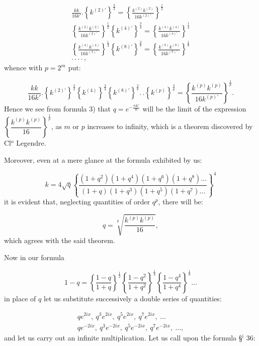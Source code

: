 \documentclass{article}
\begin{document}
\[
\begin{gathered}
\frac{kk}{16k'}.\left\{k^{(2)\prime}\right\}^{\frac{3}{2}}=\left\{\frac{k^{(2)}k^{(2)}}{16k^{(2)\prime}}\right\}^{\frac{1}{2}}\\[1.5ex]
\left\{\frac{k^{(2)}k^{(2)}}{16k^{(2)\prime}}\right\}^{\frac{1}{2}}\left\{k^{(4)\prime}\right\}^{\frac{3}{4}}=\left\{\frac{k^{(4)}k^{(4)}}{16k^{(4)\prime}}\right\}^{\frac{1}{4}}\\[1.5ex]
\left\{\frac{k^{(4)}k^{(4)}}{16k^{(4)\prime}}\right\}^{\frac{1}{4}}\left\{k^{(8)\prime}\right\}^{\frac{3}{8}}=\left\{\frac{k^{(8)}k^{(8)}}{16k^{(8)\prime}}\right\}^{\frac{1}{8}}\\[1.5ex]
.\,.\,.\,.\,,
\end{gathered}
\]
whence with $p=2^{m}$ put:

\[
\frac{kk}{16k'}.\left\{k^{(2)\prime}\right\}^{\frac{3}{2}}\left\{k^{(4)}\right\}^{\frac{3}{4}}\left\{k^{(8)\prime}\right\}^{\frac{3}{8}}.\,.\left\{k^{(p)}\right\}^{\frac{3}{p}}=\left\{\frac{k^{(p)}k^{(p)}}{16k^{(p)\prime}}\right\}^{\frac{1}{p}}.
\]
Hence we see from formula 3) that $q=e^{-\frac{\pi K'}{K}}$ will be the limit of the expression $\left\{\dfrac{k^{(p)}k^{(p)}}{16}\right\}^{\frac{1}{p}}$, as $m$ or $p$ increases to infinity, which is a theorem discovered by Cl$^{\mathrm{o}}$ Legendre.

Moreover, even at a mere glance at the formula exhibited by us:

\[
k=4\sqrt{q}\left\{\frac{(1+q^{2})(1+q^{4})(1+q^{6})(1+q^{8})\ldots}{(1+q)(1+q^{3})(1+q^{5})(1+q^{7})\ldots}\right\}^{4}
\]
it is evident that, neglecting quantities of order $q^{p}$, there will be:

\[
q=\sqrt[p]{\frac{k^{(p)}k^{(p)}}{16}},
\]
which agrees with the said theorem.

Now in our formula

\[
1-q=\left\{\frac{1-q}{1+q}\right\}^{\frac{1}{2}}\left\{\frac{1-q^{2}}{1+q^{2}}\right\}^{\frac{1}{4}}\left\{\frac{1-q^{4}}{1+q^{4}}\right\}^{\frac{1}{8}}\ldots
\]
in place of $q$ let us substitute successively a double series of quantities:

\[
\begin{gathered}
qe^{2ix},\ q^{3}e^{2ix},\ q^{5}e^{2ix},\ q^{7}e^{2ix},\ \ldots\\[1ex]
qe^{-2ix},\ q^{3}e^{-2ix},\ q^{5}e^{-2ix},\ q^{7}e^{-2ix},\ \ldots,
\end{gathered}
\]
and let us carry out an infinite multiplication. Let us call upon the formula §$^{\mathrm{i}}$ 36:
\end{document}
